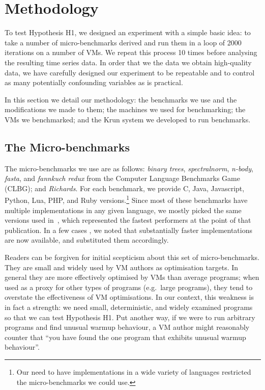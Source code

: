 \documentclass[10pt,preprint]{sigplanconf}
\newcommand{\krun}{Krun\xspace}
\newcommand{\hypone}{H1\xspace}
\newcommand{\binarytrees}{\emph{binary trees}\xspace}
\newcommand{\richards}{\emph{Richards}\xspace}
\newcommand{\spectralnorm}{\emph{spectralnorm}\xspace}
\newcommand{\nbody}{\emph{n-body}\xspace}
\newcommand{\fasta}{\emph{fasta}\xspace}
\newcommand{\fannkuch}{\emph{fannkuch redux}\xspace}
\begin{document}
\section{Methodology}
\label{sec:methodology}

To test Hypothesis H1, we designed an experiment with a simple basic idea: to
take a number of micro-benchmarks derived and
run them in a loop of 2000 iterations on a number of VMs. We repeat this
process 10 times before analysing the resulting time series data. In order
that we the data we obtain high-quality data, we have carefully designed our
experiment to be repeatable and to control as many potentially confounding variables as
is practical.

In this section we detail our methodology: the benchmarks we use and the
modifications we made to them; the machines we used for benchmarking; the VMs we
benchmarked; and the \krun system we developed to run benchmarks.


\subsection{The Micro-benchmarks}

The micro-benchmarks we use are as follows: \binarytrees, \spectralnorm, \nbody,
\fasta, and \fannkuch from the Computer Language Benchmarks Game (CLBG); and
\richards. For each benchmark, we provide C, Java, Javascript, Python, Lua, PHP,
and Ruby versions.\footnote{Our need to have implementations in a wide variety
of languages restricted the micro-benchmarks we could use.} Since most of these
benchmarks have multiple implementations in any given language, we mostly picked
the same versions used in~\cite{bolz14impact}, which represented the fastest
performers at the point of that publication. In a few cases , we noted that
substantially faster implementations are now available, and substituted them
accordingly.

Readers can be forgiven for initial scepticism about this set of micro-benchmarks.
They are small and widely
used by VM authors as optimisation targets. In general they are more effectively
optimised by VMs than average programs; when used as a proxy for other types
of programs (e.g.~large programs), they tend to overstate the effectiveness of
VM optimisations. In our context, this weakness is in fact a strength: we need
small, deterministic, and widely examined programs so that we can test
Hypothesis \hypone. Put another way, if we were to run arbitrary programs
and find unusual warmup behaviour, a VM author might reasonably counter that
``you have found the one program that exhibits unusual warmup behaviour''.
\end{document}

